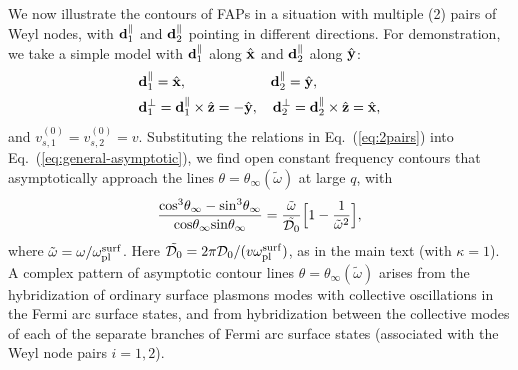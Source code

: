 \documentclass[aps,twocolumn,prl,groupedaddress]{revtex4}
\newcommand{\be}{\begin{equation}}
\newcommand{\ee}{\end{equation}}
\renewcommand{\vec}[1]{{\bf #1}}
\begin{document}
We now illustrate the contours of FAPs in a situation with multiple (2) pairs of Weyl nodes, with $\vec d_1^\parallel$ and $\vec{d}_2^\parallel$ pointing in different directions.
For demonstration, we take a simple model with $\vec{d}_1^\parallel$ along $\hat{\vec{x}}$ and $\vec{d}_2^\parallel$ along $\hat{\vec{y}}$:
\begin{align}
& \vec{d}_1^\parallel = \hat{\vec{x}}, \quad \quad \quad \quad \quad \quad \vec{d}_2^\parallel = \hat{\vec{y}}, \nonumber \\
& \vec{d}_1^\perp = \vec{d}_1^\parallel \times \hat{\vec{z}} = -\hat{\vec{y}}, \quad \vec{d}_2^\perp = \vec{d}_2^\parallel \times \hat{\vec{z}} = \hat{\vec{x}},
\label{eq:2pairs}
\end{align}
and $v_{s,1}^{(0)} = v_{s,2}^{(0)} = v$. 
Substituting the relations in Eq.~(\ref{eq:2pairs}) into Eq.~(\ref{eq:general-asymptotic}), we find  
open constant frequency contours that asymptotically approach the lines $\theta = \theta_\infty (\tilde{\omega})$ at large $q$, with
\be
\frac{{\rm cos}^3 \theta_\infty -{\rm sin}^3 \theta_\infty}{{\rm cos}\theta_\infty{\rm sin}\theta_\infty} = \frac{\tilde{\omega}}{\tilde{\mathcal{D}_0}} \Big[ 1- \frac{1}{\tilde{\omega}^2}\Big],
\ee
where $\tilde{\omega} = \omega/\omega_{\rm pl}^{\rm surf}$. 
Here $\tilde{\mathcal{D}_0} = 2\pi \mathcal{D}_0/(v \omega_{\rm pl}^{\rm surf})$, as in the main text (with $\kappa = 1$). 
A complex pattern of asymptotic contour lines $\theta = \theta_\infty(\tilde{\omega})$ arises from the hybridization of ordinary surface plasmons modes with collective oscillations in the Fermi arc surface states, and from hybridization between the collective modes of each of the separate branches of Fermi arc surface states (associated with the Weyl node pairs $i = 1,2$).
\end{document}
